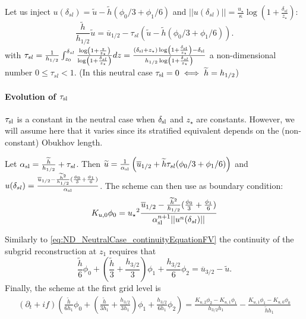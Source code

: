 Let us inject $u(\delta_{sl}) = \widetilde{u} - \widetilde{h}(\phi_0/3 + \phi_1/6)$ and $||u(\delta_{sl})|| = \frac{{u_\star}}{\kappa}\log(1+\frac{\delta_{sl}}{z_\star})$:
\begin{equation}
\frac{\widetilde{h}}{h_{1/2}}\widetilde{u} = \overline{u}_{1/2} - \tau_{sl}\left(\widetilde{u} - \widetilde{h}(\phi_0/3 + \phi_1/6)\right).
\end{equation}
with $\tau_{sl} = \frac{1}{{h_{1/2}}}\int_{z_0}^{\delta_{sl}} \frac{\log(1+\frac{z}{z_{\star}})}{\log(1+\frac{\delta_{sl}}{z_\star})} dz =
\frac{(\delta_{\rm sl} + z_\star)\log(1+\frac{\delta_{\rm sl}}{z_\star}) - \delta_{\rm sl}}{h_{1/2}\log(1+\frac{\delta_{sl}}{z_\star})}$ a non-dimensional number $0 \leq\tau_{sl} < 1$. (In this neutral case $\tau_{\rm sl} = 0 \iff \widetilde{h}=h_{1/2}$)

\paragraph{Evolution of $\tau_{\rm sl}$}
$\tau_{\rm sl}$ is a constant in the neutral case
when $\delta_{\rm sl}$ and $z_\star$ are constants. However,
we will assume here that it varies since its stratified equivalent
depends on the (non-constant) Obukhov length.

Let $\alpha_{\rm sl} = \frac{\widetilde{h}}{h_{1/2}}+\tau_{sl}$.
Then $\widetilde{u} = \frac{1}{\alpha_{\rm sl}}\left(\overline{u}_{1/2} + \widetilde{h}\tau_{sl}(\phi_0/3 + \phi_1/6)\right)$
and $u(\delta_{sl})=\frac{\overline{u}_{1/2} - \frac{\widetilde{h}^2}{h_{1/2}}
(\frac{\phi_0}{3} + \frac{\phi_1}{6})}{\alpha_{\rm sl}}$.
The scheme can then use as boundary condition:
\begin{equation}
	\label{eq:ND_NeutralCase_boundaryCondFVfree}
	K_{u,0} \phi_0 = {u_\star}^2
	\frac{\overline{u}_{1/2} - \frac{\widetilde{h}^2}{h_{1/2}}(\frac{\phi_0}{3} + \frac{\phi_1}{6})}{\alpha_{\rm sl}^{n+1}||u^n(\delta_{sl})||}
\end{equation}

Similarly to \eqref{eq:ND_NeutralCase_continuityEquationFV}
the continuity of the subgrid reconstruction at $z_1$ requires that
\begin{equation}
	\label{eq:ND_NeutralCase_continuityFVfree}
    \frac{\widetilde{h}}{6} 
    \phi_0
    +
    (\frac{\widetilde{h}}{3} 
    + \frac{h_{3/2}}{3})
    \phi_1
    + \frac{h_{3/2}}{6} \phi_2
     = \overline{u}_{3/2} - 
     \widetilde{u}.
\end{equation}
Finally, the scheme at the first grid level is
\begin{equation}
	\label{eq:ND_NeutralCase_prognosticEqFVfree}
    \begin{aligned}
(\partial_t + if)
    \left(\frac{\widetilde{h}}{6h_1} 
    \phi_0
    +
    \left(
    \frac{\widetilde{h}}{3h_1} 
    + \frac{h_{3/2}}{3h_1}
    \right)
    \phi_1
    + \frac{h_{3/2}}{6h_1} \phi_2\right)
    =
	    \frac{K_{u,2} \phi_2 - K_{u,1} \phi_1}{h_{3/2}h_1} - \frac{K_{u,1} \phi_1 - K_{u,0} \phi_0 }{\widetilde{h}h_1}
    \end{aligned}
\end{equation}

